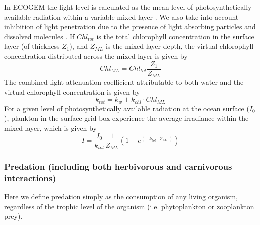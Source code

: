 \documentclass[gmd, manuscript]{copernicus}
\begin{document}
In ECOGEM the light level is  calculated as the mean level of photosynthetically available radiation within a variable mixed layer \citep[with depth calculated according to][]{Kraus:1967b}. We also take into account inhibition of light penetration due to the presence of light absorbing particles and dissolved molecules \citep{Shigsesada:1981}. If $Chl_{tot}$ is the total chlorophyll concentration in the surface layer (of thickness $Z_1$), and $Z_{ML}$ is the mixed-layer depth, the virtual chlorophyll concentration distributed across the mixed layer is given by
%
\begin{equation}
Chl_{ML} = Chl_{tot} \frac{Z_1}{Z_{ML}}
\end{equation}
%
The combined light-attenuation coefficient attributable to both water and the virtual chlorophyll concentration is given by
%
\begin{equation}
 k_{tot} = k_w + k_{chl} \cdot Chl_{ML}
\end{equation}
%
For a given level of photosynthetically available radiation at the ocean surface ($I_0$), plankton in the surface grid box experience the average irradiance within the mixed layer, which is given by
%
\begin{equation}
I = \frac{I_0}{k_{tot}} \frac{1}{Z_{ML}} (1-e^{(-k_{tot}\cdot Z_{ML})})
\end{equation}
%

\subsubsection{Predation (including both herbivorous and carnivorous interactions)}

Here we define predation simply as the consumption of any living organism, regardless of the trophic level of the organism (i.e. phytoplankton or zooplankton prey).
\end{document}
